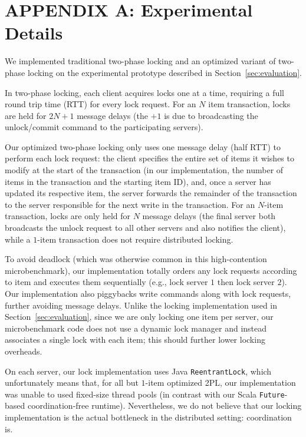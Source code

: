 
\normalsize

\section*{APPENDIX A: Experimental Details}

 We implemented traditional two-phase locking and an optimized variant of two-phase locking on the experimental prototype described in Section~\ref{sec:evaluation}.

In two-phase locking, each client acquires locks one at a time, requiring a full round trip time (RTT) for every lock request. For an $N$ item transaction, locks are held for $2N+1$ message delays (the $+1$ is due to broadcasting the unlock/commit command to the participating servers).

Our optimized two-phase locking only uses one message delay (half RTT) to perform each lock request: the client specifies the entire set of items it wishes to modify at the start of the transaction (in our implementation, the number of items in the transaction and the starting item ID), and, once a server has updated its respective item, the server forwards the remainder of the transaction to the server responsible for the next write in the transaction. For an $N$-item transaction, locks are only held for $N$ message delays (the final server both broadcasts the unlock request to all other servers and also notifies the client), while a $1$-item transaction does not require distributed locking.

To avoid deadlock (which was otherwise common in this high-contention microbenchmark), our implementation totally orders any lock requests according to item and executes them sequentially (e.g., lock server $1$ then lock server $2$). Our implementation also piggybacks write commands along with lock requests, further avoiding message delays. Unlike the locking implementation used in Section~\ref{sec:evaluation}, since we are only locking one item per server, our microbenchmark code does not use a dynamic lock manager and instead associates a single lock with each item; this should further lower locking overheads.

On each server, our lock implementation uses Java \texttt{ReentrantLock}, which unfortunately means that, for all but $1$-item optimized 2PL, our implementation was unable to used fixed-size thread pools (in contrast with our Scala \texttt{Future}-based coordination-free runtime). Nevertheless, we do not believe that our locking implementation is the actual bottleneck in the distributed setting: coordination is.

